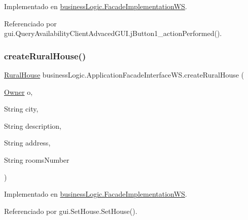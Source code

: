 Implementado en \mbox{\hyperlink{classbusiness_logic_1_1_facade_implementation_w_s_a5bbdf1cf4235a84736744f3516ec1dae}{business\+Logic.\+Facade\+Implementation\+WS}}.



Referenciado por gui.\+Query\+Availability\+Client\+Advaced\+G\+U\+I.\+j\+Button1\+\_\+action\+Performed().

\mbox{\label{interfacebusiness_logic_1_1_application_facade_interface_w_s_a624b00ae79c85436420d62cf34a082d7}} 
\subsubsection{\texorpdfstring{createRuralHouse()}{createRuralHouse()}}
{\footnotesize\ttfamily \mbox{\hyperlink{classdomain_1_1_rural_house}{Rural\+House}} business\+Logic.\+Application\+Facade\+Interface\+W\+S.\+create\+Rural\+House (\begin{DoxyParamCaption}\item[{\mbox{\hyperlink{classdomain_1_1_owner}{Owner}}}]{o,  }\item[{String}]{city,  }\item[{String}]{description,  }\item[{String}]{address,  }\item[{String}]{rooms\+Number }\end{DoxyParamCaption})}



Implementado en \mbox{\hyperlink{classbusiness_logic_1_1_facade_implementation_w_s_a2df596d357c02b4aef6711526347c951}{business\+Logic.\+Facade\+Implementation\+WS}}.



Referenciado por gui.\+Set\+House.\+Set\+House().

\mbox{\label{interfacebusiness_logic_1_1_application_facade_interface_w_s_a553cbfb37ea9f1621ba76ad8308a15da}} 
